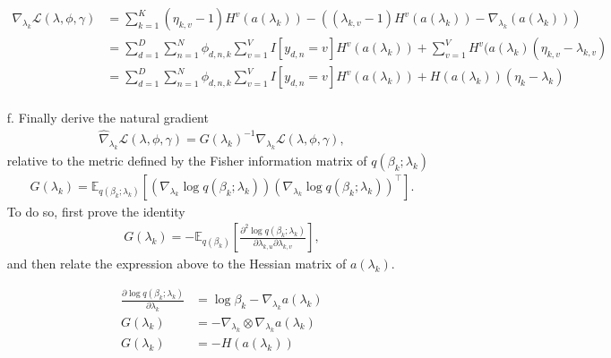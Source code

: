 \documentclass [12pt]{article}
\newcommand{\E}{\ensuremath{\mathbb{E}}}
\begin{document}
\begin{itemize}
\begin{align*}
    \nabla_{\lambda_{k}} \mathcal{L}(\lambda, \phi, \gamma) &= \sum_{k=1}^K (\eta_{k,v} -1) H^{v} (a(\lambda_k)) - \left((\lambda_{k,v} -1) H^{v}(a(\lambda_k)) -  \nabla_{\lambda_k} (a(\lambda_k))  \right) \\
    &= \sum_{d=1}^D \sum_{n=1}^N \phi_{d,n,k} \sum_{v=1}^V I[y_{d,n} = v]  H^{v}(a(\lambda_k) ) + \sum_{v=1}^V H^{v}(a(\lambda_k) (\eta_{k,v} -\lambda_{k,v} )  \\
    &= \sum_{d=1}^D \sum_{n=1}^N \phi_{d,n,k} \sum_{v=1}^V I[y_{d,n} = v]  H^{v}(a(\lambda_k) ) + H (a(\lambda_k)) (\eta_k -\lambda_k ) \\
\end{align*}
\item[f.] Finally derive the natural gradient 
\begin{align*}
	\hat{\nabla}_{\lambda_k} \mathcal{L}(\lambda, \phi, \gamma)
    =
    G(\lambda_k)^{-1}
    \nabla_{\lambda_{k}}
    \mathcal{L}(\lambda, \phi, \gamma)
    ,
\end{align*}
relative to the metric defined by the Fisher information matrix of $q(\beta_k ; \lambda_k)$
\begin{align*}
	G(\lambda_k) 
    = 
    \E_{q(\beta_k ; \lambda_k)}
    \left[
    	\left(
        	\nabla_{\lambda_k} \log q(\beta_k ; \lambda_k)
        \right)
    	\left(
        	\nabla_{\lambda_k} \log q(\beta_k ; \lambda_k)
        \right)^\top
    \right].
\end{align*}
To do so, first prove the identity
\begin{align*}
	G(\lambda_k)
    =
	-\E_{q(\beta_k)}
    \left[
    	\frac{\partial^2 \log q(\beta_k ; \lambda_k)}{\partial \lambda_{k,u} \partial \lambda_{k,v}}
    \right],
\end{align*}
and then relate the expression above to the Hessian matrix of $a(\lambda_k)$.



\begin{align*}
    \frac{\partial \log q(\beta_k ; \lambda_k)}{\partial \lambda_{k}} &= \log \beta_k  - \nabla_{\lambda_k} a(\lambda_k) \\
    G(\lambda_k) &= - \nabla_{\lambda_k} \otimes \nabla_{\lambda_k} a(\lambda_k) \\
    G(\lambda_k) &= -H(a(\lambda_k))
\end{align*}


\end{itemize}
\end{document}

